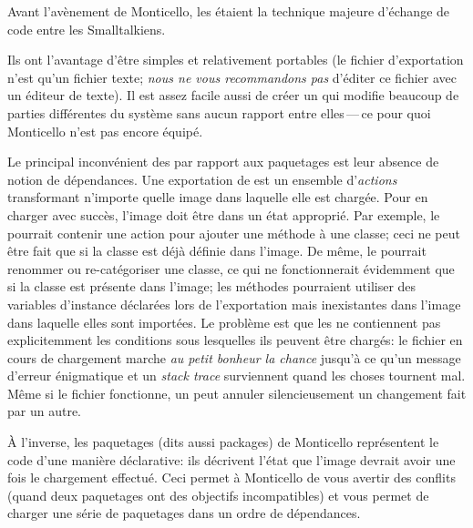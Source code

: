 \documentclass[a4paper,10pt,twoside]{book}
\begin{document}
Avant l'avènement de Monticello, les \changesets étaient la
technique majeure d'échange de code entre les Smalltalkiens. %

Ils ont l'avantage d'être simples et relativement portables (le fichier d'exportation 
n'est qu'un fichier texte; \emph{nous ne vous recommandons pas} d'éditer ce fichier 
avec un éditeur de texte).
Il est assez facile aussi de créer un \changeset qui modifie
beaucoup de parties différentes du système sans aucun rapport
entre elles\,---\,ce pour quoi Monticello n'est pas encore équipé.

Le principal inconvénient des \changesets par rapport aux paquetages 
est leur absence de notion de dépendances.
Une exportation de \changeset est un ensemble d'\emph{actions} transformant n'importe quelle
image dans laquelle elle est chargée. Pour en charger avec succès, l'image doit être
dans un état approprié.
Par exemple, le \changeset pourrait contenir une action pour ajouter une méthode à une
classe; ceci ne peut être fait que si la classe est déjà définie dans l'image.
De même, le \changeset pourrait renommer ou re-catégoriser une classe, ce qui ne 
fonctionnerait évidemment que si la classe est présente dans l'image; les méthodes
pourraient utiliser des variables d'instance déclarées lors de l'exportation mais
inexistantes dans l'image dans laquelle elles sont importées.
Le problème est que les \changesets ne contiennent pas explicitemment les conditions 
sous lesquelles ils peuvent être chargés:
le fichier en cours de chargement marche \emph{au petit bonheur la chance} jusqu'à
ce qu'un message d'erreur énigmatique et un \emph{stack trace} surviennent
quand les choses tournent mal.
Même si le fichier fonctionne, un \changeset peut annuler silencieusement 
un changement fait par un autre.

À l'inverse, les paquetages (dits aussi packages) de Monticello représentent le code d'une manière 
déclarative: ils décrivent l'état que l'image devrait avoir une fois le chargement
effectué.
Ceci permet à Monticello de vous avertir des conflits (quand deux paquetages ont des
objectifs incompatibles)
et vous permet de charger une série de paquetages dans un ordre de dépendances.
\end{document}
